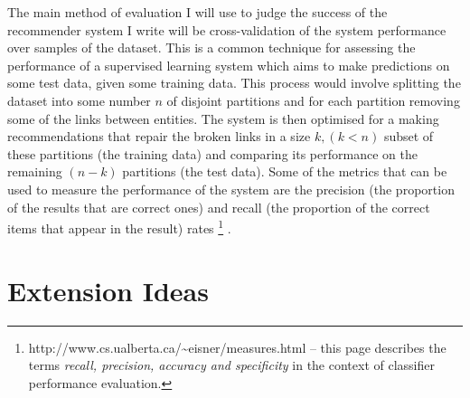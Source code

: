 The main method of evaluation I will use to judge the success of the recommender system I write will be cross-validation of the system performance over samples of the dataset. This is a common technique for assessing the performance of a supervised learning system which aims to make predictions on some test data, given some training data. This process would involve splitting the dataset into some number $n$ of disjoint partitions and for each partition removing some of the links between entities. The system is then optimised for a making recommendations that repair the broken links in a size $k, (k < n)$ subset of these partitions (the training data) and comparing its performance on the remaining $(n-k)$ partitions (the test data). Some of the metrics that can be used to measure the performance of the system are the precision (the proportion of the results that are correct ones) and recall (the proportion of the correct items that appear in the result) rates \footnote{http://www.cs.ualberta.ca/\textasciitilde eisner/measures.html -- this page describes the terms \textit{recall, precision, accuracy and specificity} in the context of classifier performance evaluation.} . 


\section{Extension Ideas}



